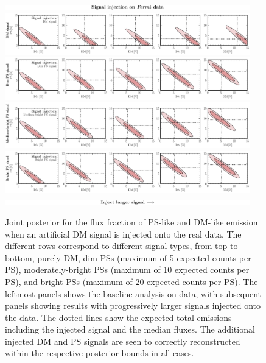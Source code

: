 \documentclass[prd,aps,10pt,nofootinbib,twocolumn,superscriptaddress,preprintnumbers,balancelastpage,longbibliography]{revtex4-1}
\begin{document}
%
\begin{figure}
\centering
\includegraphics[width=0.95\textwidth]{plots/sig_inj_title.pdf}
\includegraphics[width=0.95\textwidth]{plots/data_sig_inj_dm.pdf}
\includegraphics[width=0.95\textwidth]{plots/data_sig_inj_dim_ps.pdf}
\includegraphics[width=0.95\textwidth]{plots/data_sig_inj_med_ps.pdf}
\includegraphics[width=0.95\textwidth]{plots/data_sig_inj_ps.pdf}
\includegraphics[width=0.95\textwidth]{plots/sig_inj_chyron.pdf}
\caption{Joint posterior for the flux fraction of PS-like and DM-like emission when an artificial DM signal is injected onto the real \Fermi data. The different rows correspond to different signal types, from top to bottom, purely DM, dim PSs (maximum of 5 expected counts per PS), moderately-bright PSs (maximum of 10 expected counts per PS), and bright PSs (maximum of 20 expected counts per PS). The leftmost panels shows the baseline analysis on \Fermi data, with subsequent panels showing results with progressively larger signals injected onto the data. The dotted lines show the expected total emissions including the injected signal and the median fluxes. The additional injected DM and PS signals are seen to correctly reconstructed within the respective posterior bounds in all cases.}
\label{fig:sig_inj_data}
\end{figure}
%
\end{document}
